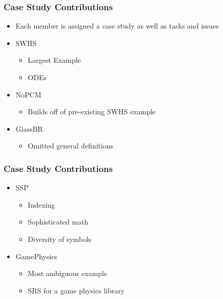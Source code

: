 \documentclass{beamer}
\begin{document}
\begin{frame}
\frametitle{Case Study Contributions}
\begin{itemize}
\item Each member is assigned a case study as well as tasks and issues\newline
\item<1-> SWHS\newline
  \begin{itemize}
    \item Largest Example\newline
    \item ODEs\newline
  \end{itemize}
\item<2-> NoPCM\newline
  \begin{itemize}
    \item Builds off of pre-existing SWHS example\newline
  \end{itemize}
\item<3-> GlassBR\newline
  \begin{itemize}
    \item Omitted general definitions\newline
  \end{itemize}
\end{itemize}
\end{frame}

\begin{frame}
\frametitle{Case Study Contributions}
\begin{itemize}
\item<1-> SSP\newline
  \begin{itemize}
    \item Indexing\newline
    \item Sophisticated math\newline
    \item Diversity of symbols\newline
  \end{itemize}
\item<2-> GamePhysics\newline
  \begin{itemize}
    \item Most ambiguous example\newline
    \item SRS for a game physics library\newline
  \end{itemize}
\end{itemize}
\end{frame}
\end{document}
